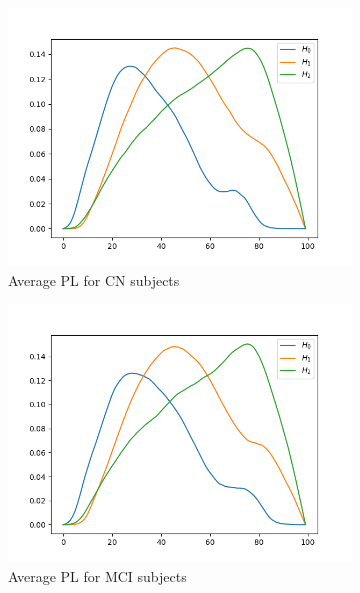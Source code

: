 \documentclass{article}
\begin{document}
\begin{figure}
  \centering
  \begin{subfigure}{0.3\textwidth}
    \includegraphics[width=\textwidth]{figures/average_pls/average_pl_CN.png}
    \caption{Average PL for CN subjects}
  \end{subfigure}
  \hfill
  \begin{subfigure}{0.3\textwidth}
    \includegraphics[width=\textwidth]{figures/average_pls/average_pl_MCI.png}
    \caption{Average PL for MCI subjects}
  \end{subfigure}
  \hfill
  \begin{subfigure}{0.3\textwidth}

\end{subfigure}
\end{figure}
\end{document}
